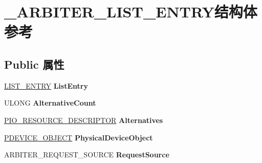 \hypertarget{struct___a_r_b_i_t_e_r___l_i_s_t___e_n_t_r_y}{}\section{\+\_\+\+A\+R\+B\+I\+T\+E\+R\+\_\+\+L\+I\+S\+T\+\_\+\+E\+N\+T\+R\+Y结构体 参考}
\label{struct___a_r_b_i_t_e_r___l_i_s_t___e_n_t_r_y}
\subsection*{Public 属性}
\begin{DoxyCompactItemize}
\item 
\mbox{\label{struct___a_r_b_i_t_e_r___l_i_s_t___e_n_t_r_y_ac0755c31b336d9b66b4ae84fc63be51b}} 
\hyperlink{struct___l_i_s_t___e_n_t_r_y}{L\+I\+S\+T\+\_\+\+E\+N\+T\+RY} {\bfseries List\+Entry}
\item 
\mbox{\label{struct___a_r_b_i_t_e_r___l_i_s_t___e_n_t_r_y_a9ead02056f9b9e972ed863c325c7672a}} 
U\+L\+O\+NG {\bfseries Alternative\+Count}
\item 
\mbox{\label{struct___a_r_b_i_t_e_r___l_i_s_t___e_n_t_r_y_abd48c10155f8bb10a329187bc03db75b}} 
\hyperlink{struct___i_o___r_e_s_o_u_r_c_e___d_e_s_c_r_i_p_t_o_r}{P\+I\+O\+\_\+\+R\+E\+S\+O\+U\+R\+C\+E\+\_\+\+D\+E\+S\+C\+R\+I\+P\+T\+OR} {\bfseries Alternatives}
\item 
\mbox{\label{struct___a_r_b_i_t_e_r___l_i_s_t___e_n_t_r_y_ab19780979487ffd1d9ad9a3202f3807b}} 
\hyperlink{struct___d_e_v_i_c_e___o_b_j_e_c_t}{P\+D\+E\+V\+I\+C\+E\+\_\+\+O\+B\+J\+E\+CT} {\bfseries Physical\+Device\+Object}
\item 
\mbox{\label{struct___a_r_b_i_t_e_r___l_i_s_t___e_n_t_r_y_ad3f836d930b6a9683e184265c01e2ee0}} 
A\+R\+B\+I\+T\+E\+R\+\_\+\+R\+E\+Q\+U\+E\+S\+T\+\_\+\+S\+O\+U\+R\+CE {\bfseries Request\+Source}
\item 
\mbox{\label{struct___a_r_b_i_t_e_r___l_i_s_t___e_n_t_r_y_ab2909073bcc80a95b991a4caad87d995}} 

\end{DoxyCompactItemize}

